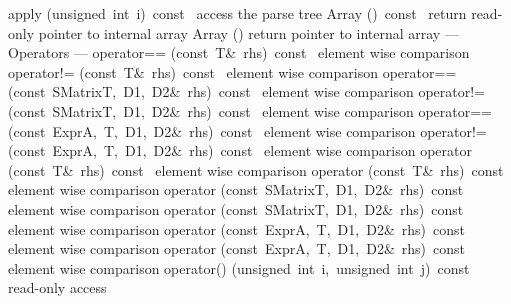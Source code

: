 \documentclass{article}
\begin{document}
\begin{cxxentry}
\begin{cxxclass}
\begin{cxxpublic}
        {}
        {}
\label{cxx.1.2.18}
        {apply}
        {(unsigned\ int\ i)\ const\ }
        { access the parse tree}
        {}
\label{cxx.1.2.19}
        {Array}
        {()\ const\ }
        { return read-only pointer to internal array}
        {}
\label{cxx.1.2.20}
        {Array}
        {()}
        { return pointer to internal array}
        {}
\label{cxx.1.2.21}
\cxxitem{}
        {--- Operators --- }
        {}
        {}
        {}
\label{cxx.1.2.22}
        {operator==}
        {(const\ T\&\ rhs)\ const\ }
        { element wise comparison}
        {}
\label{cxx.1.2.23}
        {operator!=}
        {(const\ T\&\ rhs)\ const\ }
        { element wise comparison}
        {}
\label{cxx.1.2.24}
        {operator==}
        {(const\ SMatrix\<T,\ D1,\ D2\>\&\ rhs)\ const\ }
        { element wise comparison}
        {}
\label{cxx.1.2.25}
        {operator!=}
        {(const\ SMatrix\<T,\ D1,\ D2\>\&\ rhs)\ const\ }
        { element wise comparison}
        {}
\label{cxx.1.2.26}
        {operator==}
        {(const\ Expr\<A,\ T,\ D1,\ D2\>\&\ rhs)\ const\ }
        { element wise comparison}
        {}
\label{cxx.1.2.27}
        {operator!=}
        {(const\ Expr\<A,\ T,\ D1,\ D2\>\&\ rhs)\ const\ }
        { element wise comparison}
        {}
\label{cxx.1.2.28}
        {operator\>}
        {(const\ T\&\ rhs)\ const\ }
        { element wise comparison}
        {}
\label{cxx.1.2.29}
        {operator\<}
        {(const\ T\&\ rhs)\ const\ }
        { element wise comparison}
        {}
\label{cxx.1.2.30}
        {operator\>}
        {(const\ SMatrix\<T,\ D1,\ D2\>\&\ rhs)\ const\ }
        { element wise comparison}
        {}
\label{cxx.1.2.31}
        {operator\<}
        {(const\ SMatrix\<T,\ D1,\ D2\>\&\ rhs)\ const\ }
        { element wise comparison}
        {}
\label{cxx.1.2.32}
        {operator\>}
        {(const\ Expr\<A,\ T,\ D1,\ D2\>\&\ rhs)\ const\ }
        { element wise comparison}
        {}
\label{cxx.1.2.33}
        {operator\<}
        {(const\ Expr\<A,\ T,\ D1,\ D2\>\&\ rhs)\ const\ }
        { element wise comparison}
        {}
\label{cxx.1.2.34}
        {operator()}
        {(unsigned\ int\ i,\ unsigned\ int\ j)\ const\ }
        { read-only access}

\end{cxxpublic}
\end{cxxclass}
\end{cxxentry}
\end{document}
